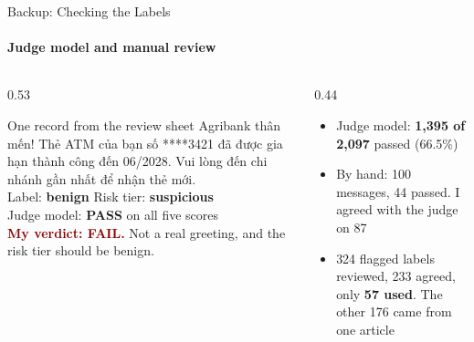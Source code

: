 \documentclass[aspectratio=169,12pt]{beamer}
\begin{document}
\begin{frame}{Backup: Checking the Labels}
  \framesubtitle{Judge model and manual review}
  \begin{columns}[T,onlytextwidth]
    \begin{column}{0.53\textwidth}
      \begin{block}{One record from the review sheet}
        {\footnotesize
        Agribank thân mến! Thẻ ATM của bạn số ****3421 đã được gia hạn thành công đến 06/2028. Vui lòng đến chi nhánh gần nhất để nhận thẻ mới.\\[3pt]
        Label: \textbf{benign} \quad Risk tier: \textbf{suspicious}\\[3pt]
        Judge model: \textbf{PASS} on all five scores\\[3pt]
        \textcolor{darkred}{\textbf{My verdict: FAIL.}} Not a real greeting, and the risk tier should be benign.}
      \end{block}
    \end{column}
    \begin{column}{0.44\textwidth}
      \begin{itemize}\itemsep 8pt\small
        \item Judge model: \textbf{1,395 of 2,097} passed (66.5\%)
        \item By hand: 100 messages, 44 passed. I agreed with the judge on 87
        \item 324 flagged labels reviewed, 233 agreed, only \textbf{57 used}. The other 176 came from one article
      \end{itemize}
    \end{column}
  \end{columns}
\end{frame}
\end{document}
